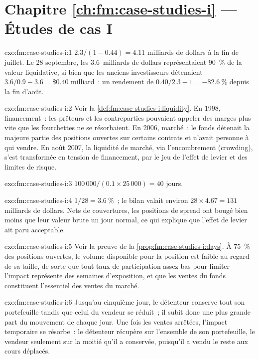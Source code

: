 \section*{Chapitre \ref{ch:fm:case-studies-i} --- Études de cas I}

\begin{solution}{exo:fm:case-studies-i:1}
$2.3/(1-0.44)=4.11$ milliards de dollars à la fin de juillet. Le 28 septembre, les 3.6~milliards de dollars représentaient 90~\% de la valeur liquidative, si bien que les anciens investisseurs détenaient
$3.6/0.9-3.6=\$0.40$ milliard~: un rendement de $0.40/2.3-1=-82.6~\%$ depuis la fin d'août.
\end{solution}

\begin{solution}{exo:fm:case-studies-i:2}
Voir la \cref{def:fm:case-studies-i:liquidity}. En 1998, financement~: les prêteurs et les contreparties pouvaient appeler des marges plus vite que les fourchettes ne se résorbaient. En
2006, marché~: le fonds détenait la majeure partie des positions ouvertes sur certains contrats et n'avait personne à qui vendre. En août 2007, la liquidité de marché, via l'encombrement (crowding), s'est transformée
en tension de financement, par le jeu de l'effet de levier et des limites de risque.
\end{solution}

\begin{solution}{exo:fm:case-studies-i:3}
$100\,000/(0.1\times25\,000)=40$ jours.
\end{solution}

\begin{solution}{exo:fm:case-studies-i:4}
$1/28=3.6~\%$~; le bilan valait environ $28\times4.67=131$ milliards de dollars. Nets de couvertures, les positions de spread ont bougé bien moins que leur valeur brute un
jour normal, ce qui explique que l'effet de levier ait paru acceptable.
\end{solution}

\begin{solution}{exo:fm:case-studies-i:5}
Voir la preuve de la \cref{prop:fm:case-studies-i:days}. À 75~\% des positions ouvertes, le volume disponible pour la position est faible au regard de sa taille,
de sorte que tout taux de participation assez bas pour limiter l'impact représente des semaines d'exposition, et que les ventes du fonds constituent l'essentiel des ventes du marché.
\end{solution}

\begin{solution}{exo:fm:case-studies-i:6}
Jusqu'au cinquième jour, le détenteur conserve tout son portefeuille tandis que celui du vendeur se réduit~; il subit donc une plus grande part du mouvement de chaque jour. Une fois les ventes arrêtées,
l'impact temporaire se résorbe~: le détenteur récupère sur l'ensemble de son portefeuille, le vendeur seulement sur la moitié qu'il a conservée, puisqu'il a vendu le reste aux cours déplacés.
\end{solution}


